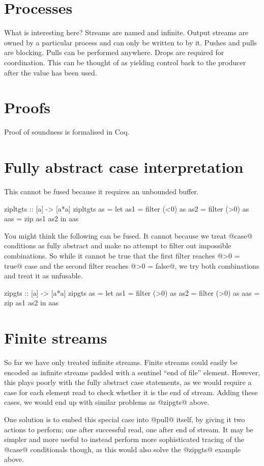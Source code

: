 
\section{Processes}
\label{s:ProcessZZZ}

What is interesting here?
Streams are named and infinite.
Output streams are owned by a particular process and can only be written to by it.
Pushes and pulls are blocking.
Pulls can be performed anywhere.
Drops are required for coordination.
This can be thought of as yielding control back to the producer after the value has been used.


\section{Proofs}
\label{s:Proofs}
Proof of soundness is formalised in Coq.

\section{Fully abstract case interpretation}

This cannot be fused because it requires an unbounded buffer.
\begin{code}
zipltgts :: [a] -> [a*a]
zipltgts as =
  let as1 = filter (<0) as
      as2 = filter (>0) as
      aas = zip as1 as2
  in  aas
\end{code}

You might think the following can be fused.
It cannot because we treat @case@ conditions as fully abstract and make no attempt to filter out impossible combinations.
So while it cannot be true that the first filter reaches @>0 = true@ case and the second filter reaches @>0 = false@, we try both combinations and treat it as unfusable.
\begin{code}
zipgts :: [a] -> [a*a]
zipgts as =
  let as1 = filter (>0) as
      as2 = filter (>0) as
      aas = zip as1 as2
  in  aas
\end{code}

\section{Finite streams}
\label{s:Finite}
So far we have only treated infinite streams.
Finite streams could easily be encoded as infinite streams padded with a sentinel ``end of file'' element.
However, this plays poorly with the fully abstract case statements, as we would require a case for each element read to check whether it is the end of stream.
Adding these cases, we would end up with similar problems as @zipgts@ above.

One solution is to embed this special case into @pull@ itself, by giving it two actions to perform; one after successful read, one after end of stream.
It may be simpler and more useful to instead perform more sophisticated tracing of the @case@ conditionals though, as this would also solve the @zipgts@ example above.


